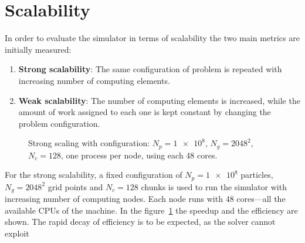 \section{Scalability}

In order to evaluate the simulator in terms of scalability the two main metrics 
are initially measured:
\begin{enumerate}
\item \textbf{Strong scalability}: The same configuration of problem is repeated 
with increasing number of computing elements.
\item \textbf{Weak scalability}: The number of computing elements is increased, 
while the amount of work assigned to each one is kept constant by changing the 
problem configuration.
\end{enumerate}
%
%
\begin{figure}[ht]%
\centering
{}
	\caption{Strong scaling with configuration: $N_p = \num{1e8}$, $N_g = 2048^2$,
	$N_c = 128$, one process per node, using each 48 cores.}
	\label{fig:strong-scaling}
\end{figure}%
%
For the strong scalability, a fixed configuration of $N_p = \num{1e8}$ 
particles, $N_g=2048^2$ grid points and $N_c=128$ chunks is used to run the 
simulator with increasing number of computing nodes. Each node runs with 48 
cores---all the available CPUs of the machine. In the 
figure~\ref{fig:strong-scaling} the speedup and the efficiency are shown.
The rapid decay of efficiency is to be expected, as the solver cannot exploit 
